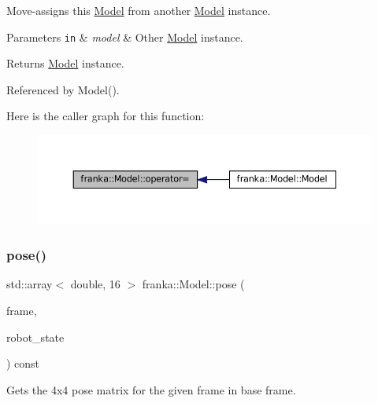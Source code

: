 Move-\/assigns this \hyperlink{classfranka_1_1Model}{Model} from another \hyperlink{classfranka_1_1Model}{Model} instance.


\begin{DoxyParams}[1]{Parameters}
\mbox{\tt in}  & {\em model} & Other \hyperlink{classfranka_1_1Model}{Model} instance.\\
\hline
\end{DoxyParams}
\begin{DoxyReturn}{Returns}
\hyperlink{classfranka_1_1Model}{Model} instance. 
\end{DoxyReturn}


Referenced by Model().

Here is the caller graph for this function\+:
\nopagebreak
\begin{figure}[H]
\begin{center}
\leavevmode
\includegraphics[width=350pt]{classfranka_1_1Model_ae45b00c240eb10447beda17f4b916ca8_icgraph}
\end{center}
\end{figure}
\mbox{\label{classfranka_1_1Model_adcd68a474d3843e5d9699c0f37fc76e8}} 
\subsubsection{\texorpdfstring{pose()}{pose()}\hspace{0.1cm}{\footnotesize\ttfamily [1/2]}}
{\footnotesize\ttfamily std\+::array$<$ double, 16 $>$ franka\+::\+Model\+::pose (\begin{DoxyParamCaption}\item[{\hyperlink{namespacefranka_a00b729ddce916481d3f0d10febec4f5b}{Frame}}]{frame,  }\item[{const \hyperlink{structfranka_1_1RobotState}{franka\+::\+Robot\+State} \&}]{robot\+\_\+state }\end{DoxyParamCaption}) const}

Gets the 4x4 pose matrix for the given frame in base frame.

